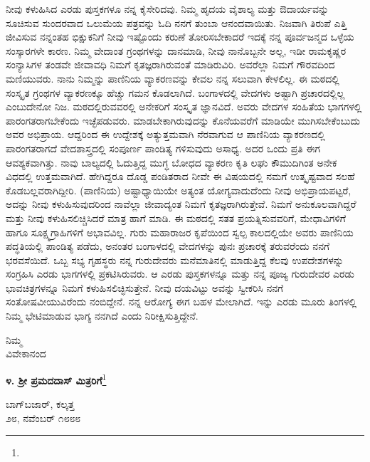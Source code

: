 ನೀವು ಕಳುಹಿಸಿದ ಎರಡು ಪುಸ್ತಕಗಳೂ ನನ್ನ ಕೈಸೇರಿದವು. ನಿಮ್ಮ ಹೃದಯ ವೈಶಾಲ್ಯ ಮತ್ತು ಔದಾರ್ಯವನ್ನು ಸೂಚಿಸುವ ಸುಂದರವಾದ ಒಲುಮೆಯ ಪತ್ರವನ್ನು ಓದಿ ನನಗೆ ತುಂಬಾ ಆನಂದವಾಯಿತು. ನಿಜವಾಗಿ ತಿರುಪೆ ಎತ್ತಿ ಜೀವಿಸುವ ನನ್ನಂತಹ ಭಿಕ್ಷುಕನಿಗೆ ನೀವು ಇಷ್ಟೊಂದು ಕರುಣೆ ತೋರಿಸಬೇಕಾದರೆ ಇದಕ್ಕೆ ನನ್ನ ಪೂರ್ವಜನ್ಮದ ಒಳ್ಳೆಯ ಸಂಸ್ಕಾರಗಳೇ ಕಾರಣ. ನಿಮ್ಮ ವೇದಾಂತ ಗ್ರಂಥಗಳನ್ನು ದಾನಮಾಡಿ, ನೀವು ನಾನೊಬ್ಬನೇ ಅಲ್ಲ, ಇಡೀ ರಾಮಕೃಷ್ಣರ ಸಂನ್ಯಾಸಿಗಳ ತಂಡವೇ ಜೀವಾವಧಿ ನಿಮಗೆ ಕೃತಜ್ಞರಾಗಿರುವಂತೆ ಮಾಡಿರುವಿರಿ. ಅವರೆಲ್ಲಾ ನಿಮಗೆ ಗೌರವದಿಂದ ಮಣಿಯುವರು. ನಾನು ನಿಮ್ಮನ್ನು ಪಾಣಿನಿಯ ವ್ಯಾಕರಣವನ್ನು ಕೇವಲ ನನ್ನ ಸಲುವಾಗಿ ಕೇಳಲಿಲ್ಲ. ಈ ಮಠದಲ್ಲಿ ಸಂಸ್ಕೃತ ಗ್ರಂಥಗಳ ವ್ಯಾಕರಣಕ್ಕೂ ಹೆಚ್ಚು ಗಮನ ಕೊಡಲಾಗಿದೆ. ಬಂಗಾಳದಲ್ಲಿ ವೇದಗಳು ಅಷ್ಟಾಗಿ ಪ್ರಚಾರದಲ್ಲಿಲ್ಲ ಎಂಬುದೇನೋ ನಿಜ. ಮಠದಲ್ಲಿರುವವರಲ್ಲಿ ಅನೇಕರಿಗೆ ಸಂಸ್ಕೃತ ಜ್ಞಾನವಿದೆ. ಅವರು ವೇದಗಳ ಸಂಹಿತೆಯ ಭಾಗಗಳಲ್ಲಿ ಪಾರಂಗತರಾಗಬೇಕೆಂದು ಇಚ್ಛೆಪಡುವರು. ಮಾಡಬೇಕಾಗಿರುವುದನ್ನು ಕೊನೆಯವರೆಗೆ ಮಾಡಿಯೇ ಮುಗಿಸಬೇಕೆಂಬುದು ಅವರ ಅಭಿಪ್ರಾಯ. ಆದ್ದರಿಂದ ಈ ಉದ್ದೇಶಕ್ಕೆ ಅತ್ಯುತ್ತಮವಾಗಿ ನೆರವಾಗುವ ಆ ಪಾಣಿನಿಯ ವ್ಯಾಕರಣದಲ್ಲಿ ಪಾರಂಗತರಾಗದೆ ವೇದಶಾಸ್ತ್ರದಲ್ಲಿ ಸಂಪೂರ್ಣ ಪಾಂಡಿತ್ಯ ಗಳಿಸುವುದು ಅಸಾಧ್ಯ. ಅದರ ಒಂದು ಪ್ರತಿ ಈಗ ಆವಶ್ಯಕವಾಗಿತ್ತು. ನಾವು ಬಾಲ್ಯದಲ್ಲಿ ಓದುತ್ತಿದ್ದ ಮುಗ್ಧ ಬೋಧದ ವ್ಯಾಕರಣ ಕೃತಿ ಲಘು ಕೌಮುದಿಗಿಂತ ಅನೇಕ ವಿಧದಲ್ಲಿ ಉತ್ತಮವಾಗಿದೆ. ಹೇಗಿದ್ದರೂ ದೊಡ್ಡ ಪಂಡಿತರಾದ ನೀವೇ ಈ ವಿಷಯದಲ್ಲಿ ನಮಗೆ ಉತ್ಕೃಷ್ಟವಾದ ಸಲಹೆ ಕೊಡಬಲ್ಲವರಾಗಿದ್ದೀರಿ. (ಪಾಣಿನಿಯ) ಅಷ್ಟಾಧ್ಯಾಯಿಯೇ ಅತ್ಯಂತ ಯೋಗ್ಯವಾದು\break ದೆಂದು ನೀವು ಅಭಿಪ್ರಾಯಪಟ್ಟರೆ, ಅದನ್ನು ನೀವು ಕಳುಹಿಸುವುದರಿಂದ ನಾವೆಲ್ಲಾ ಜೀವಾದ್ಯಂತ ನಿಮಗೆ ಕೃತಜ್ಞರಾಗಿರುತ್ತೇವೆ. ನಿಮಗೆ ಅನುಕೂಲವಾಗಿದ್ದರೆ ಮತ್ತು ನೀವು ಕಳುಹಿಸಲಿಚ್ಚಿಸಿದರೆ ಮಾತ್ರ ಹಾಗೆ ಮಾಡಿ. ಈ ಮಠದಲ್ಲಿ ಸತತ ಪ್ರಯತ್ನಿಸುವವರಿಗೆ, ಮೇಧಾವಿಗಳಿಗೆ ಹಾಗೂ ಸೂಕ್ಷ್ಮಗ್ರಾಹಿಗಳಿಗೆ ಅಭಾವವಿಲ್ಲ. ಗುರು ಮಹಾರಾಜರ ಕೃಪೆಯಿಂದ ಸ್ವಲ್ಪ ಕಾಲದಲ್ಲಿಯೇ ಅವರು ಪಾಣಿನಿಯ ಪದ್ಧತಿಯಲ್ಲಿ ಪಾಂಡಿತ್ಯ ಪಡೆದು, ಅನಂತರ ಬಂಗಾಳದಲ್ಲಿ ವೇದಗಳನ್ನು ಪುನಃ ಪ್ರಚಾರಕ್ಕೆ ತರುವರೆಂದು ನನಗೆ ಭರವಸೆಯಿದೆ. ಒಬ್ಬ ಸಭ್ಯ ಗೃಹಸ್ಥರು ನನ್ನ ಗುರುದೇವರು ಮನೆಮಾತಿನಲ್ಲಿ ಮಾಡುತ್ತಿದ್ದ ಕೆಲವು ಉಪದೇಶಗಳನ್ನು ಸಂಗ್ರಹಿಸಿ ಎರಡು ಭಾಗಗಳಲ್ಲಿ ಪ್ರಕಟಿಸಿರುವರು. ಆ ಎರಡು ಪುಸ್ತಕಗಳನ್ನೂ ಮತ್ತು ನನ್ನ ಪೂಜ್ಯ ಗುರುದೇವರ ಎರಡು ಭಾವಚಿತ್ರಗಳನ್ನೂ ನಿಮಗೆ ಕಳು\break ಹಿಸಲಿಚ್ಛಿಸುತ್ತೇನೆ. ನೀವು ದಯವಿಟ್ಟು ಅವನ್ನು ಸ್ವೀಕರಿಸಿ ನನಗೆ ಸಂತೋಷವೀಯುವಿರೆಂದು ನಂಬಿದ್ದೇನೆ. ನನ್ನ ಆರೋಗ್ಯ ಈಗ ಬಹಳ ಮೇಲಾಗಿದೆ. ಇನ್ನು ಎರಡು ಮೂರು ತಿಂಗಳಲ್ಲಿ ನಿಮ್ಮ ಭೇಟಿಮಾಡುವ ಭಾಗ್ಯ ನನಗಿದೆ ಎಂದು ನಿರೀಕ್ಷಿಸುತ್ತಿದ್ದೇನೆ.
\vspace{-0.5cm}

{\flushright
ನಿಮ್ಮ\\ವಿವೇಕಾನಂದ\par}

\begin{center}
\textbf{೪. ಶ‍್ರೀ ಪ್ರಮದದಾಸ್ ಮಿತ್ರರಿಗೆ}\footnote{}
\end{center}
\vspace{-0.5cm}

\begin{flushright}
ಬಾಗ್‌ಬಜಾರ್, ಕಲ್ಕತ್ತ \\೨೮, ನವೆಂಬರ್ ೧೮೮೮
\end{flushright}

